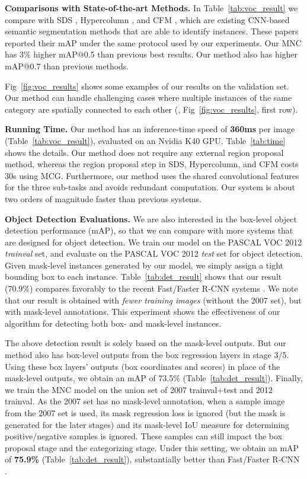 \documentclass[10pt,twocolumn,letterpaper]{article}
\begin{document}
\vspace{.5em}
\noindent\textbf{Comparisons with State-of-the-art Methods.} In Table~\ref{tab:voc_result} we compare with SDS \cite{Hariharan2014}, Hypercolumn \cite{Hariharan2015}, and CFM \cite{Dai2015}, which are existing CNN-based semantic segmentation methods that are able to identify instances. These papers reported their mAP under the same protocol used by our experiments.
Our MNC has 3\% higher mAP@0.5 than previous best results. Our method also has higher mAP@0.7 than previous methods.


Fig~\ref{fig:voc_results} shows some examples of our results on the validation set. Our method can handle challenging cases where multiple instances of the same category are spatially connected to each other (\eg, Fig~\ref{fig:voc_results}, first row).

\vspace{.5em}
\noindent\textbf{Running Time.}
Our method has an inference-time speed of \textbf{360ms} per image (Table~\ref{tab:voc_result}), evaluated on an Nvidia K40 GPU. Table~\ref{tab:time} shows the details.
Our method does not require any external region proposal method, whereas the region proposal step in SDS, Hypercolumn, and CFM costs 30s using MCG. Furthermore, our method uses the shared convolutional features for the three sub-tasks and avoids redundant computation. Our system is about two orders of magnitude faster than previous systems.

\vspace{.5em}
\noindent\textbf{Object Detection Evaluations.} We are also interested in the box-level object detection performance (mAP), so that we can compare with more systems that are designed for object detection.
We train our model on the PASCAL VOC 2012 \emph{trainval} set, and evaluate on the PASCAL VOC 2012 \emph{test} set for object detection.
Given mask-level instances generated by our model, we simply assign a tight bounding box to each instance.
Table~\ref{tab:det_result} shows that our result (70.9\%) compares favorably to the recent Fast/Faster R-CNN systems \cite{Girshick2015,Ren2015}. We note that our result is obtained with \emph{fewer training images} (without the 2007 set), but with mask-level annotations. This experiment shows the effectiveness of our algorithm for detecting both box- and mask-level instances.

The above detection result is solely based on the mask-level outputs. But our method also has box-level outputs from the box regression layers in stage 3/5. Using these box layers' outputs (box coordinates and scores) in place of the mask-level outputs, we obtain an mAP of 73.5\% (Table~\ref{tab:det_result}).
Finally, we train the MNC model on the union set of 2007 trainval+test and 2012 trainval. As the 2007 set has no mask-level annotation, when a sample image from the 2007 set is used, its mask regression loss is ignored (but the mask is generated for the later stages) and its mask-level IoU measure for determining positive/negative samples is ignored. These samples can still impact the box proposal stage and the categorizing stage. Under this setting, we obtain an mAP of \textbf{75.9\%} (Table~\ref{tab:det_result}), substantially better than Fast/Faster R-CNN \cite{Girshick2015,Ren2015}.
\end{document}
